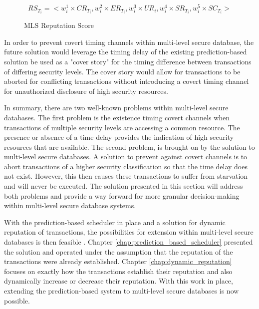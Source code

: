 \begin{figure}[h]
\captionsetup{justification=centering}
\centering %

\[\textrm{$RS_{T_{i}} = <w_{i}^{1}\times CR_{T_{i}},w_{i}^{2}\times ER_{T_{i}},w_{i}^{3}\times UR_{i},w_{i}^{4}\times SR_{T_{i}},w_{i}^{5}\times SC_{T_{i}}>$}\]

\caption{MLS Reputation Score} %
\label{fig:mls_reputation_score} %

\end{figure}

In order to prevent covert timing channels within multi-level secure database, the future solution would leverage the timing delay of the existing prediction-based solution be used as a "cover story" for the timing difference between transactions of differing security levels. The cover story would allow for transactions to be aborted for conflicting transactions without introducing a covert timing channel for unauthorized disclosure of high security resources.

In summary, there are two well-known problems within multi-level secure databases. The first problem is the existence timing covert channels when transactions of multiple security levels are accessing a common resource. The presence or absence of a time delay provides the indication of high security resources that are available. The second problem, is brought on by the solution to multi-level secure databases. A solution to prevent against covert channels is to abort transactions of a higher security classification so that the time delay does not exist. However, this then causes these transactions to suffer from starvation and will never be executed. The solution presented in this section will address both problems and provide a way forward for more granular decision-making within multi-level secure database systems.

With the prediction-based scheduler in place and a solution for dynamic reputation of transactions, the possibilities for extension within multi-level secure databases is then feasible . Chapter \ref{chap:prediction_based_scheduler} presented the solution and operated under the assumption that the reputation of the transactions were already established. Chapter \ref{chap:dynamic_reputation} focuses on exactly how the transactions establish their reputation and also dynamically increase or decrease their reputation. With this work in place, extending the prediction-based system to multi-level secure databases is now possible.